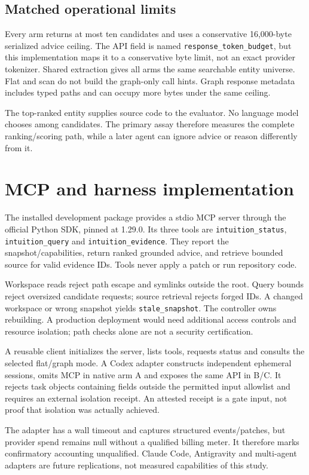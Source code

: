 \documentclass[11pt]{article}
\begin{document}
\subsection{Matched operational limits}
Every arm returns at most ten candidates and uses a conservative 16,000-byte serialized advice ceiling. The API field is named \texttt{response\_token\_budget}, but this implementation maps it to a conservative byte limit, not an exact provider tokenizer. Shared extraction gives all arms the same searchable entity universe. Flat and scan do not build the graph-only call hints. Graph response metadata includes typed paths and can occupy more bytes under the same ceiling.

The top-ranked entity supplies source code to the evaluator. No language model chooses among candidates. The primary assay therefore measures the complete ranking/scoring path, while a later agent can ignore advice or reason differently from it.

\section{MCP and harness implementation}
The installed development package provides a stdio MCP server through the official Python SDK, pinned at 1.29.0. Its three tools are \texttt{intuition\_status}, \texttt{intuition\_query} and \texttt{intuition\_evidence}. They report the snapshot/capabilities, return ranked grounded advice, and retrieve bounded source for valid evidence IDs. Tools never apply a patch or run repository code.

Workspace reads reject path escape and symlinks outside the root. Query bounds reject oversized candidate requests; source retrieval rejects forged IDs. A changed workspace or wrong snapshot yields \texttt{stale\_snapshot}. The controller owns rebuilding. A production deployment would need additional access controls and resource isolation; path checks alone are not a security certification.

A reusable client initializes the server, lists tools, requests status and consults the selected flat/graph mode. A Codex adapter constructs independent ephemeral sessions, omits MCP in native arm A and exposes the same API in B/C. It rejects task objects containing fields outside the permitted input allowlist and requires an external isolation receipt. An attested receipt is a gate input, not proof that isolation was actually achieved.

The adapter has a wall timeout and captures structured events/patches, but provider spend remains null without a qualified billing meter. It therefore marks confirmatory accounting unqualified. Claude Code, Antigravity and multi-agent adapters are future replications, not measured capabilities of this study.
\end{document}
